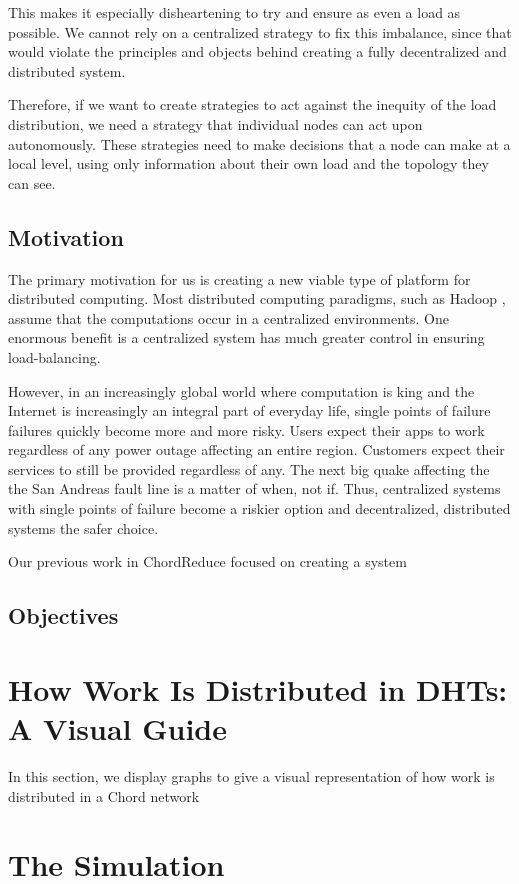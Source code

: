 This makes it especially disheartening to try and ensure as even a load as possible.
We cannot rely on a centralized strategy to fix this imbalance, since that would violate the principles and objects behind creating a fully decentralized and distributed system.

Therefore, if we want to create strategies to act against the inequity of the load distribution, we need a strategy that individual nodes can act upon autonomously.
These strategies need to make decisions that a node can make at a local level, using only information about their own load and the topology they can see.


\subsection{Motivation}
The primary motivation for us is creating a new viable type of platform for distributed computing.
Most distributed computing paradigms, such as Hadoop \cite{hadoop}, assume that the computations occur in a centralized environments.
One enormous benefit is a centralized system has much greater control in ensuring load-balancing.

However, in an increasingly global world where computation is king and the Internet is increasingly an integral part of everyday life, single points of failure failures quickly become more and more risky.
Users expect their apps to work regardless of any power outage affecting an entire region.
Customers expect their services to still be provided regardless of any.
The next big quake affecting the the San Andreas fault line is a matter of when, not if.
Thus, centralized systems with single points of failure become a riskier option and decentralized, distributed systems the safer choice.


Our previous work in ChordReduce \cite{chordreduce} focused on creating a system

\subsection{Objectives}


\section{How Work Is Distributed in DHTs: A Visual Guide}
In this section, we display graphs to give a visual representation of how work is distributed in a Chord \cite{chord} network

\section{The Simulation}

